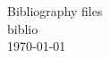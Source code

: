 \sloppy
\setlength{\textwidth}{6.5in}
\setlength{\textheight}{9in}
\setlength{\topmargin}{-0.5in}
\setlength{\oddsidemargin}{0pt}
\setlength{\evensidemargin}{0pt}
\newcommand{\eg}{e.g.}		%
\newcommand{\ie}{i.e.}		%
\newcommand{\etc}{etc.}		%
\newcommand{\vs}{{\em vs.}}		%

\begin{center} \Large Bibliography files \large \\
biblio
\\ \today
\end{center}
\nocite{*}



